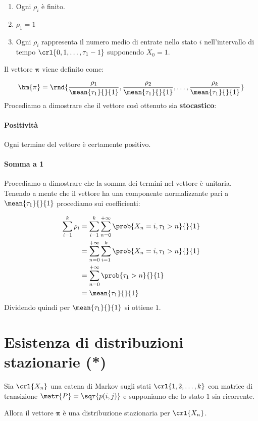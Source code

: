 \documentclass[\main/main.tex]{subfiles}
\begin{document}
\begin{enumerate}
	\item Ogni \(\rho_i\) è finito.
	\item \(\rho_1 = 1\)
	\item Ogni \(\rho_i\) rappresenta il numero medio di entrate nello stato \(i\) nell'intervallo di tempo \(\crl{0,1,\ldots,\tau_1-1}\) supponendo \(X_0 = 1\).
\end{enumerate}

Il vettore \(\bm{\pi}\) viene definito come:

\[
	\bm{\pi} = \rnd{\frac{\rho_1}{\mean{\tau_1}{}{1}}, \frac{\rho_2}{\mean{\tau_1}{}{1}}, \ldots, \frac{\rho_k}{\mean{\tau_1}{}{1}}}
\]
Procediamo a dimostrare che il vettore così ottenuto sia \textbf{stocastico}:

\paragraph*{Positività} Ogni termine del vettore è certamente positivo.

\paragraph*{Somma a 1} Procediamo a dimostrare che la somma dei termini nel vettore è unitaria. Tenendo a mente che il vettore ha una componente normalizzante pari a \(\mean{\tau_1}{}{1}\) procediamo sui coefficienti:

\begin{align*}
	\sum_{i=1}^k \rho_i & = \sum_{i=1}^k \sum_{n=0}^{+\infty} \prob{X_n = i, \tau_1 > n}{}{1} \\
	                    & = \sum_{n=0}^{+\infty} \sum_{i=1}^k \prob{X_n = i, \tau_1 > n}{}{1} \\
	                    & = \sum_{n=0}^{+\infty} \prob{\tau_1 > n}{}{1}                       \\
	                    & = \mean{\tau_1}{}{1}
\end{align*}
Dividendo quindi per \(\mean{\tau_1}{}{1}\) si ottiene \(1\).

\section{Esistenza di distribuzioni stazionarie (*)}
\begin{theorem}
	Sia \(\crl{X_n}\) una catena di Markov sugli stati \(\crl{1, 2, \ldots, k}\) con matrice di transizione \(\matr{P} = \sqr{p(i,j)}\) e supponiamo che lo stato \(1\) sia ricorrente.

	Allora il vettore \(\bm{\pi}\) è una distribuzione stazionaria per \(\crl{X_n}\).
\end{theorem}
\end{document}
